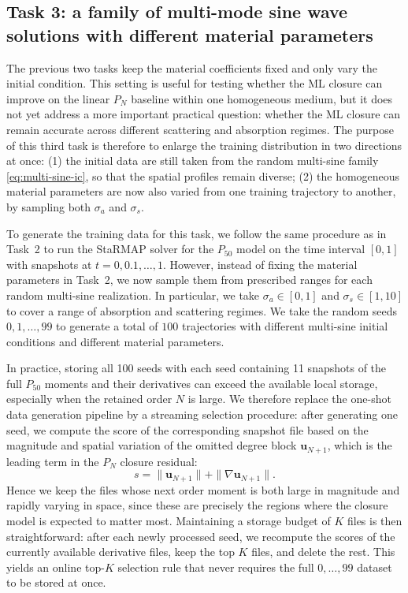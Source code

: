\documentclass[11pt]{article}
\numberwithin{equation}{section}
\newcommand{\vect}[1]{\boldsymbol{#1}}
\begin{document}
\subsection{Task 3: a family of multi-mode sine wave solutions with different material parameters}

The previous two tasks keep the material coefficients fixed and only vary the initial condition. This setting is useful for testing whether the ML closure can improve on the linear $P_N$ baseline within one homogeneous medium, but it does not yet address a more important practical question: whether the ML closure can remain accurate across different scattering and absorption regimes. The purpose of this third task is therefore to enlarge the training distribution in two directions at once: (1) the initial data are still taken from the random multi-sine family \eqref{eq:multi-sine-ic}, so that the spatial profiles remain diverse; (2) the homogeneous material parameters are now also varied from one training trajectory to another, by sampling both $\sigma_a$ and $\sigma_{s}$.



To generate the training data for this task, we follow the same procedure as in Task~2 to run the StaRMAP solver for the $P_{50}$ model on the time interval $[0,1]$ with snapshots at $t=0,0.1,\dots,1$. However, instead of fixing the material parameters in Task~2, we now sample them from prescribed ranges for each random multi-sine realization. In particular, we take $\sigma_a \in [0, 1]$ and $\sigma_{s} \in [1, 10]$ to cover a range of absorption and scattering regimes. We take the random seeds $0,1,\dots,99$ to generate a total of $100$ trajectories with different multi-sine initial conditions and different material parameters.




In practice, storing all 100 seeds with each seed containing 11 snapshots of the full $P_{50}$ moments and their derivatives can exceed the available local storage, especially when the retained order $N$ is large. 
We therefore replace the one-shot data generation pipeline by a streaming selection procedure: after generating one seed, we compute the score of the corresponding snapshot file based on the magnitude and spatial variation of the omitted degree block $\vect{u}_{N+1}$, which is the leading term in the $P_N$ closure residual:
\begin{equation}
    s = \|\vect{u}_{N+1}\| + \|\nabla \vect{u}_{N+1}\|.
\end{equation}
Hence we keep the files whose next order moment is both large in magnitude and rapidly varying in space, since these are precisely the regions where the closure model is expected to matter most. Maintaining a storage budget of $K$ files is then straightforward: after each newly processed seed, we recompute the scores of the currently available derivative files, keep the top $K$ files, and delete the rest. This yields an online top-$K$ selection rule that never requires the full $0,\dots,99$ dataset to be stored at once.
\end{document}
